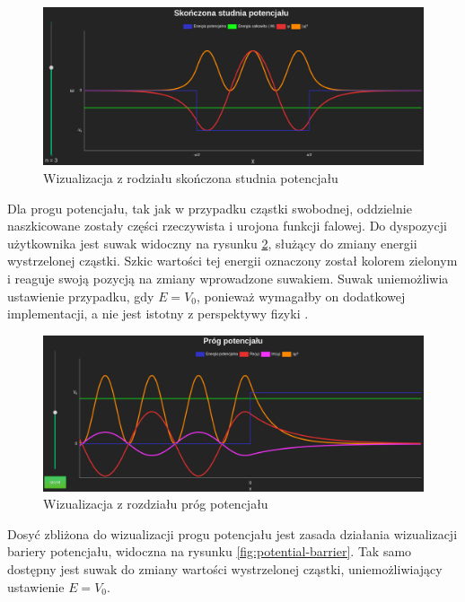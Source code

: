 \documentclass{SGGW-thesis}
\begin{document}
	\begin{figure}[H]
	\includegraphics[width=\textwidth,height=\textheight,keepaspectratio]{fiwell.png} 
	\caption{Wizualizacja z rodziału skończona studnia potencjału}
	\label{fig:fi-well}
	\end{figure}
	
	Dla progu potencjału, tak jak w przypadku cząstki swobodnej, oddzielnie naszkicowane zostały części rzeczywista i urojona funkcji falowej. Do dyspozycji użytkownika jest suwak widoczny na rysunku \ref{fig:potential-jump}, służący do zmiany energii wystrzelonej cząstki. Szkic wartości tej energii oznaczony został kolorem zielonym i reaguje swoją pozycją na zmiany wprowadzone suwakiem. Suwak uniemożliwia ustawienie przypadku, gdy $E=V_0$, ponieważ wymagałby on dodatkowej implementacji, a nie jest istotny z perspektywy fizyki \cite{}.
	
	\begin{figure}[H]
	\includegraphics[width=\textwidth,height=\textheight,keepaspectratio]{jump.png} 
	\caption{Wizualizacja z rozdziału próg potencjału}
	\label{fig:potential-jump}
	\end{figure}
	
	Dosyć zbliżona do wizualizacji progu potencjału jest zasada działania wizualizacji bariery potencjału, widoczna na rysunku \ref{fig:potential-barrier}. Tak samo dostępny jest suwak do zmiany wartości wystrzelonej cząstki, uniemożliwiający ustawienie $E=V_0$.
	
\end{document}
